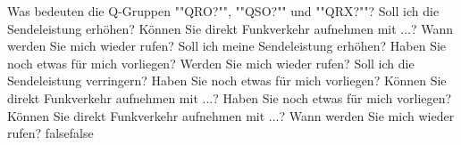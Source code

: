     {Was bedeuten die Q-Gruppen ""QRO?"", ""QSO?"" und ""QRX?""?}
    {Soll ich die Sendeleistung erhöhen? Können Sie direkt Funkverkehr aufnehmen mit ...? Wann werden Sie mich wieder rufen?}
    {Soll ich meine Sendeleistung erhöhen? Haben Sie noch etwas für mich vorliegen? Werden Sie mich wieder rufen?}
    {Soll ich die Sendeleistung verringern? Haben Sie noch etwas für mich vorliegen? Können Sie direkt Funkverkehr aufnehmen mit ...?}
    {Haben Sie noch etwas für mich vorliegen? Können Sie direkt Funkverkehr aufnehmen mit ...? Wann werden Sie mich wieder rufen?}
    {false}{false}